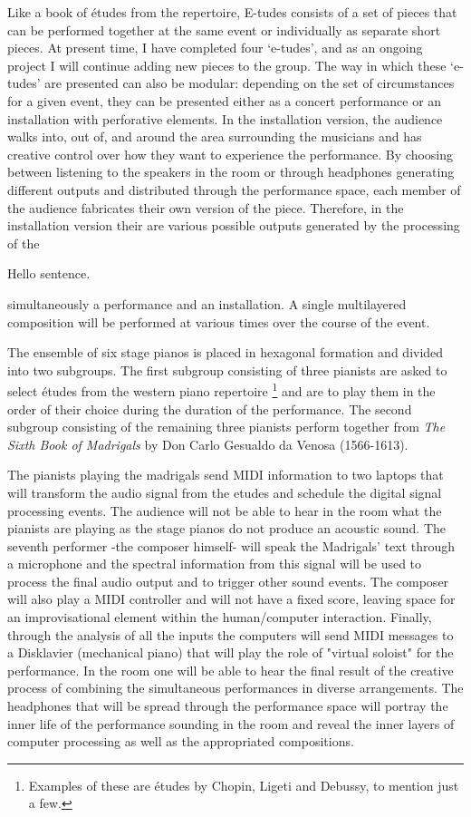 Like a book of \'{e}tudes from the repertoire, E-tudes consists of a set of pieces that can be performed together at the same event or individually as separate short pieces. At present time, I have completed four `e-tudes', and as an ongoing project I will continue adding new pieces to the group. The way in which these `e-tudes' are presented can also be modular: depending on the set of circumstances for a given event, they can be presented either as a concert performance or an installation with perforative elements. In the installation version, the audience walks into, out of, and around the area surrounding the musicians and has creative control over how they want to experience the performance. By choosing between listening to the speakers in the room or through headphones generating different outputs and distributed through the performance space, each member of the audience fabricates their own version of the piece. Therefore, in the installation version their are various possible outputs generated by the processing of the

Hello sentence.

	simultaneously a performance and an installation. A single multilayered composition will be performed at various times over the course of the event.

The ensemble of six stage pianos is placed in hexagonal formation and divided into two subgroups. The first subgroup consisting of three pianists are asked to select \'{e}tudes from the western piano repertoire \footnote{Examples of these are \'{e}tudes by Chopin, Ligeti and Debussy, to mention just a few.} and are to play them in the order of their choice during the duration of the performance. The second subgroup consisting of the remaining three pianists perform together from \emph{The Sixth Book of Madrigals} by Don Carlo Gesualdo da Venosa (1566-1613). 

The pianists playing the madrigals send MIDI information to two laptops that will transform the audio signal from the etudes and schedule the digital signal processing events. The audience will not be able to hear in the room what the pianists are playing as the stage pianos do not produce an acoustic sound. The seventh performer -the composer himself- will speak the Madrigals' text through a microphone and the spectral information from this signal will be used to process the final audio output and to trigger other sound events. The composer will also play a MIDI controller and will not have a fixed score, leaving space for an improvisational element within the human/computer interaction. Finally, through the analysis of all the inputs the computers will send MIDI messages to a Disklavier (mechanical piano) that will play the role of "virtual soloist" for the performance. In the room one will be able to hear the final result of the creative process of combining the simultaneous performances in diverse arrangements. The headphones that will be spread through the performance space will portray the inner life of the performance sounding in the room and reveal the inner layers of computer processing as well as the appropriated compositions.

